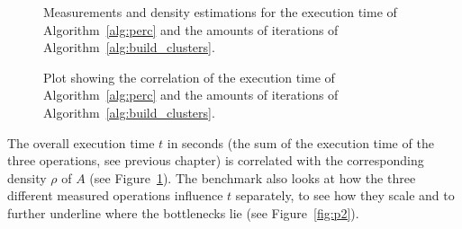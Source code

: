 \documentclass[twoside,11pt]{article}
\begin{document}
\begin{figure}[htbp]
\begin{center}
\vspace{1.5cm}

\caption{Measurements and density estimations for the
 execution time of Algorithm~\ref{alg:perc} and the amounts
 of iterations of Algorithm~\ref{alg:build_clusters}.}
\label{fig:p1}
\end{center}
\end{figure}

\begin{figure}%
\begin{center}
\caption{Plot showing the correlation of the execution time
of Algorithm~\ref{alg:perc} and the amounts of iterations
of Algorithm~\ref{alg:build_clusters}.}
\label{fig:p1:e}
\end{center}
\end{figure}

The overall execution time $t$ in seconds (the sum
of the execution time of the three operations, see previous
chapter) is correlated with the corresponding density $\rho$
of $A$ (see Figure~\ref{fig:p1}).
The benchmark also looks at how the three different
measured operations influence $t$ separately, to see how
they scale and to further underline where the bottlenecks
lie (see Figure~\ref{fig:p2}).
\end{document}
